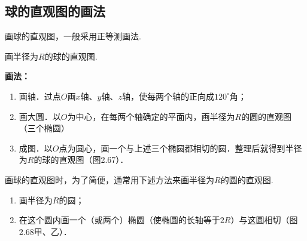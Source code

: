 \subsection{球的直观图的画法}
画球的直观图，一般采用正等测画法.

\begin{example}
画半径为$R$的球的直观图.
\end{example}

\begin{solution}
\textbf{画法：}
\begin{enumerate}[(1)]
\item 画轴．过点$O$画$x$轴、$y$轴、$z$轴，使每两个轴的正向成$120^{\circ}$角；
\item 画大圆．以$O$为中心，在每两个轴确定的平面内，画半径为$R$的圆的直观图（三个椭圆）
\item 成图．以$O$点为圆心，画一个与上述三个椭圆都相切的圆．整理后就得到半径为$R$的球的直观图（图2.67）．
\end{enumerate}
\end{solution}

\begin{note}
画球的直观图时，为了简便，通常用下述方法来画半径为$R$的圆的直观图.
\begin{enumerate}[(1)]
    \item 画半径为$R$的圆；
    \item 在这个圆内画一个（或两个）椭圆（使椭圆的长轴等于$2R$）与这圆相切（图2.68甲、乙）．
\end{enumerate}
\end{note}


